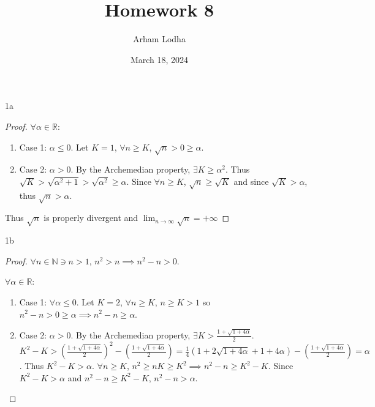 \documentclass{article}
\newcommand{\R}{\mathbb{R}}
\newcommand{\N}{\mathbb{N}}
\begin{document}
\title{Homework 8}
\author{Arham Lodha}%
\date{March 18, 2024}%
\maketitle

\begin{PROB}{1a}\label{Problem 1a.}
\end{PROB}
\begin{proof}
    $\forall \alpha \in \R$:
    
    \begin{enumerate}
        \item Case 1: $\alpha \leq 0$. Let $K = 1$, $\forall n \geq K$, $\sqrt{n} > 0 \geq \alpha$.
        \item Case 2: $\alpha > 0$. By the Archemedian property, $\exists K \geq \alpha^2$. Thus $\sqrt{K} > \sqrt{\alpha^2 + 1} > \sqrt{\alpha^2} \geq \alpha$. Since $\forall n \geq K$, $\sqrt{n} \geq \sqrt{K}$ and since $\sqrt{K} > \alpha$, thus $\sqrt{n} > \alpha$.               
    \end{enumerate}
    
    Thus $\sqrt{n}$ is properly divergent and $\lim_{n \to \infty} \sqrt{n} = + \infty$  
\end{proof}

\begin{PROB}{1b}\label{Problem 1b.}
\end{PROB}
\begin{proof}

    $\forall n \in \N \ni n > 1$, $n^2 > n \implies n^2 - n > 0$.     

    $\forall \alpha \in \R$:
    \begin{enumerate}
        \item Case 1: $\forall \alpha \leq 0$. Let $K = 2$, $\forall n \geq K$, $n \geq K > 1$ so $n^2 - n > 0 \geq \alpha \implies n^2 - n \geq \alpha$. 
        \item Case 2: $\alpha > 0$. By the Archemedian property, $\exists K > \frac{1 + \sqrt{1 + 4\alpha}}{2}$. $K^2 - K > \left(\frac{1 + \sqrt{1 + 4\alpha}}{2}\right)^2 - \left(\frac{1 + \sqrt{1 + 4\alpha}}{2}\right) = \frac{1}{4}(1 + 2\sqrt{1 + 4\alpha} + 1 + 4\alpha) - \left(\frac{1 + \sqrt{1 + 4\alpha}}{2}\right) = \alpha$. Thus $K^2 - K > \alpha$. $\forall n \geq K$, $n^2 \geq nK \geq K^2 \implies n^2 - n \geq K^2 - K$. Since $K^2 - K > \alpha$ and $n^2 - n \geq K^2 - K$, $n^2 - n > \alpha$.                 
    \end{enumerate}
\end{proof}
\end{document}
